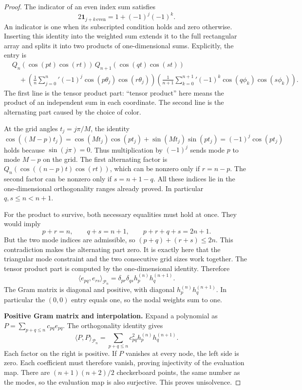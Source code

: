 \begin{proof}
The indicator of an even index sum satisfies
\[
 2\mathbf1_{j+k\,\mathrm{even}}=1+(-1)^j(-1)^k.
\]
An indicator is one when its subscripted condition holds and zero
otherwise. Inserting this identity into the weighted sum extends it to
the full rectangular array and splits it into two products of
one-dimensional sums. Explicitly, the entry is
\begin{align*}
 &Q_n(\cos(pt)\cos(rt))\,
       Q_{n+1}(\cos(qt)\cos(st))\\
 &\quad+
 \left(\frac1n\sum_{j=0}^n{}'(-1)^j
                    \cos(p\theta_j)\cos(r\theta_j)\right)
 \left(\frac1{n+1}\sum_{k=0}^{n+1}{}'(-1)^k
                    \cos(q\phi_k)\cos(s\phi_k)\right).
\end{align*}
The first line is the tensor product part: ``tensor product'' here
means the product of an independent sum in each coordinate. The
second line is the alternating part caused by the choice of color.

At the grid angles $t_j=j\pi/M$, the identity
\[
 \cos((M-p)t_j)
 =\cos(Mt_j)\cos(pt_j)+\sin(Mt_j)\sin(pt_j)
 =(-1)^j\cos(pt_j)
\]
holds because $\sin(j\pi)=0$. Thus multiplication by $(-1)^j$
sends mode $p$ to mode $M-p$ on the grid. The first alternating factor
is $Q_n(\cos((n-p)t)\cos(rt))$, which can be nonzero only if
$r=n-p$. The second factor can be nonzero only if $s=n+1-q$.
All these indices lie in the one-dimensional orthogonality ranges
already proved. In particular $q,s\leq n<n+1$.

For the product to survive, both necessary equalities must hold at once.
They would imply
\[
 p+r=n,\qquad q+s=n+1,\qquad p+r+q+s=2n+1.
\]
But the two mode indices are admissible, so
$(p+q)+(r+s)\leq2n$. This contradiction makes the alternating part
zero. It is exactly here that the triangular mode constraint and the
two consecutive grid sizes work together. The tensor product part is
computed by the one-dimensional identity. Therefore
\[
 \langle e_{pq},e_{rs}\rangle_{\mathcal P_n}
 =\delta_{pr}\delta_{qs}h_p^{(n)}h_q^{(n+1)}.
\]
The Gram matrix is diagonal and positive, with diagonal
$h_p^{(n)}h_q^{(n+1)}$. In particular the $(0,0)$ entry equals one,
so the nodal weights sum to one.

\noindent\textbf{Positive Gram matrix and interpolation.}
Expand a polynomial as $P=\sum_{p+q\leq n}c_{pq}e_{pq}$.
The orthogonality identity gives
\[
 \langle P,P\rangle_{\mathcal P_n}
  =\sum_{p+q\leq n}c_{pq}^2h_p^{(n)}h_q^{(n+1)}.
\]
Each factor on the right is positive. If $P$ vanishes at every node,
the left side is zero. Each coefficient must therefore vanish, proving
injectivity of the evaluation map. There are $(n+1)(n+2)/2$
checkerboard points, the same number as the modes, so the evaluation
map is also surjective. This proves unisolvence.


\end{proof}
